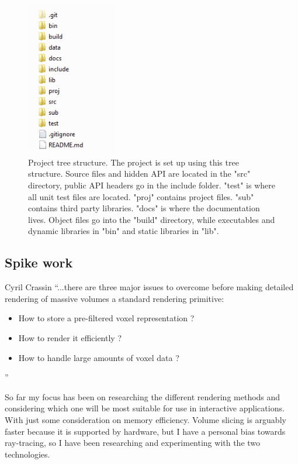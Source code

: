 \documentclass[11pt,fleqn,twoside]{article}
\begin{document}
\begin{figure}
\centering
\includegraphics[width=0.35\textwidth]{project-structure}
\caption{Project tree structure. The project is set up using this 
tree structure. Source files and hidden API are located in the "src" directory,
public API headers go in the include folder. "test" is where all unit test files are located. "proj" contains project files. "sub" contains third party libraries. "docs" is where the documentation lives. Object files go into the "build" directory, while executables and dynamic libraries in "bin" and static libraries in "lib".
}
\label{fig:projectSetup}
\end{figure}


\FloatBarrier
\subsection{Spike work}
\label{sec:spikeWork}

\begin{aquote}{Cyril Crassin\cite{CCrassinThesis}}
	``...there are three major issues to overcome before making detailed rendering of massive volumes
	a standard rendering primitive:
	\begin{itemize}
		\item How to store a pre-filtered voxel representation ?
		\item How to render it efficiently ?
		\item How to handle large amounts of voxel data ?
	\end{itemize}''
\end{aquote}

So far my focus has been on researching the different rendering methods and considering which one will be most suitable for use in interactive applications. With just some consideration on memory efficiency. Volume slicing is arguably faster\cite{AlgorithmComparison} because it is supported by hardware, but I have a personal bias towards ray-tracing, so I have been researching and experimenting with the two technologies.
\end{document}
